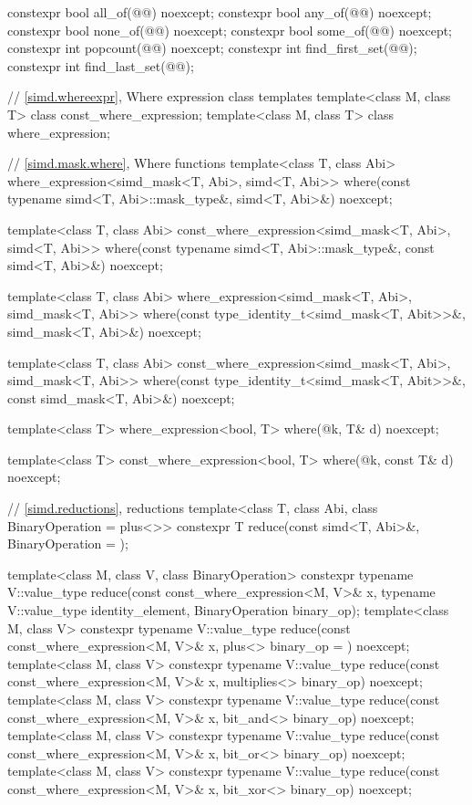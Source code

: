\begin{codeblock}
{  constexpr bool all_of(@@) noexcept;
  constexpr bool any_of(@@) noexcept;
  constexpr bool none_of(@@) noexcept;
  constexpr bool some_of(@@) noexcept;
  constexpr int popcount(@@) noexcept;
  constexpr int find_first_set(@@);
  constexpr int find_last_set(@@);

  // \ref{simd.whereexpr}, Where expression class templates
  template<class M, class T> class const_where_expression;
  template<class M, class T> class where_expression;

  // \ref{simd.mask.where}, Where functions
  template<class T, class Abi>
    where_expression<simd_mask<T, Abi>, simd<T, Abi>>
      where(const typename simd<T, Abi>::mask_type&, simd<T, Abi>&) noexcept;

  template<class T, class Abi>
    const_where_expression<simd_mask<T, Abi>, simd<T, Abi>>
      where(const typename simd<T, Abi>::mask_type&, const simd<T, Abi>&) noexcept;

  template<class T, class Abi>
    where_expression<simd_mask<T, Abi>, simd_mask<T, Abi>>
      where(const type_identity_t<simd_mask<T, Abit>>&, simd_mask<T, Abi>&) noexcept;

  template<class T, class Abi>
    const_where_expression<simd_mask<T, Abi>, simd_mask<T, Abi>>
      where(const type_identity_t<simd_mask<T, Abit>>&, const simd_mask<T, Abi>&) noexcept;

  template<class T>
    where_expression<bool, T>
      where(@\seebelow@ k, T& d) noexcept;

  template<class T>
    const_where_expression<bool, T>
      where(@\seebelow@ k, const T& d) noexcept;

  // \ref{simd.reductions},  reductions
  template<class T, class Abi, class BinaryOperation = plus<>>
    constexpr T reduce(const simd<T, Abi>&,
                       BinaryOperation = {});

  template<class M, class V, class BinaryOperation>
    constexpr typename V::value_type reduce(const const_where_expression<M, V>& x,
                                            typename V::value_type identity_element,
                                            BinaryOperation binary_op);
  template<class M, class V>
    constexpr typename V::value_type reduce(const const_where_expression<M, V>& x,
                                            plus<> binary_op = {}) noexcept;
  template<class M, class V>
    constexpr typename V::value_type reduce(const const_where_expression<M, V>& x,
                                            multiplies<> binary_op) noexcept;
  template<class M, class V>
    constexpr typename V::value_type reduce(const const_where_expression<M, V>& x,
                                            bit_and<> binary_op) noexcept;
  template<class M, class V>
    constexpr typename V::value_type reduce(const const_where_expression<M, V>& x,
                                            bit_or<> binary_op) noexcept;
  template<class M, class V>
    constexpr typename V::value_type reduce(const const_where_expression<M, V>& x,
                                            bit_xor<> binary_op) noexcept;

}
\end{codeblock}
